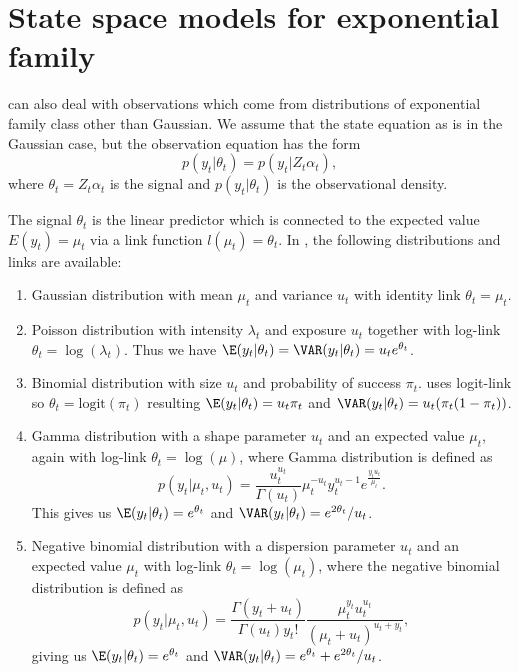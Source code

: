 \documentclass[nojss,article]{jss}\usepackage[]{graphicx}\usepackage[]{color}
\begin{document}
\section{State space models for exponential family}\label{exp}

 can also deal with observations which come from distributions of exponential family class other than Gaussian. We assume that the state equation as is in the Gaussian case, but the observation equation has the form
\begin{equation*}
p(y_t|\theta_t) = p(y_t|Z_t\alpha_t),
\end{equation*}
where $\theta_t=Z_t\alpha_t$ is the signal and $p(y_t|\theta_t)$ is the observational density. 

The signal $\theta_t$ is the linear predictor which is connected to the expected value $E(y_t)=\mu_t$ via a link function $l(\mu_t)=\theta_t$. In , the following distributions and links are available:

\begin{enumerate}
\item Gaussian distribution with mean $\mu_t$ and variance $u_t$ with identity link $\theta_t=\mu_t$. 

\item Poisson distribution with intensity $\lambda_t$ and exposure $u_t$ together with log-link $\theta_t = \log(\lambda_t)$. Thus we have $\E(y_t|\theta_t)=\VAR(y_t|\theta_t)=u_t e^{\theta_t}$.

\item Binomial distribution with size $u_t$ and probability of success $\pi_t$.  uses logit-link so $\theta_t = \textrm{logit}(\pi_t)$ resulting $\E(y_t|\theta_t)=u_t\pi_t$ and $\VAR(y_t|\theta_t) = u_t(\pi_t(1-\pi_t))$.

\item Gamma distribution with a shape parameter $u_t$ and an expected value $\mu_t$, again with log-link $\theta_t = \log(\mu)$, where Gamma distribution is defined as
\begin{equation*}
p(y_t|\mu_t,u_t) = \frac{u_t^{u_t}}{\Gamma(u_t)}\mu_t^{-u_t}y_t^{u_t-1}e^{\frac{y_t u_t}{\mu_t}}.
\end{equation*}
This gives us $\E(y_t|\theta_t)=e^{\theta_t}$ and $\VAR(y_t|\theta_t) = e^{2\theta_t}/u_t$.

\item Negative binomial distribution with a dispersion parameter $u_t$ and an expected value $\mu_t$ with log-link $\theta_t = \log(\mu_t)$, where the negative binomial distribution is defined as 
\begin{equation*}
p(y_t|\mu_t,u_t) = \frac{\Gamma(y_t+u_t)}{\Gamma(u_t)y_t!}\frac{\mu_t^{y_t} u_t^{u_t}}{(\mu_t+u_t)^{u_t+y_t}},
\end{equation*}
giving us $\E(y_t|\theta_t)=e^{\theta_t}$ and $\VAR(y_t|\theta_t) = e^{\theta_t} + e^{2\theta_t}/u_t$.
\end{enumerate}
\end{document}
